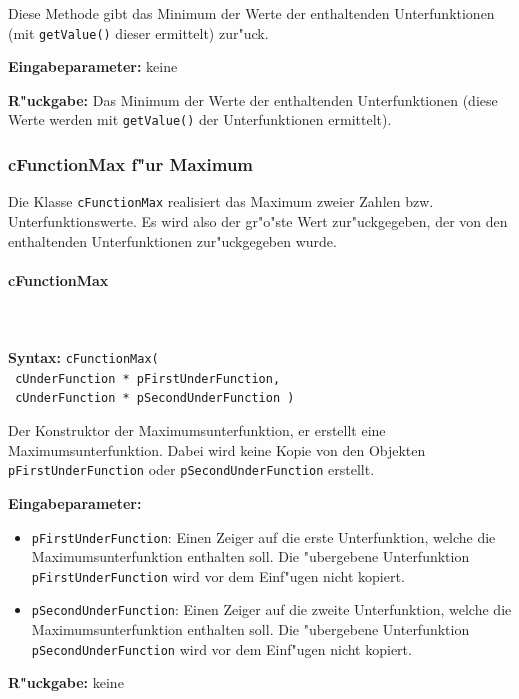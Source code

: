 \bigskip\noindent
Diese Methode gibt das Minimum der Werte der enthaltenden Unterfunktionen (mit \verb|getValue()| dieser ermittelt) zur"uck.

\bigskip\noindent
\textbf{Eingabeparameter:} keine

\bigskip\noindent
\textbf{R"uckgabe:} Das Minimum der Werte der enthaltenden Unterfunktionen (diese Werte werden mit \verb|getValue()| der Unterfunktionen ermittelt).


\subsubsection{cFunctionMax f"ur Maximum}

Die Klasse \verb|cFunctionMax| realisiert das Maximum zweier Zahlen bzw. Unterfunktionswerte. Es wird also der gr"o"ste Wert zur"uckgegeben, der von den enthaltenden Unterfunktionen zur"uckgegeben wurde.

\paragraph{cFunctionMax}

\ \\\\\noindent
\textbf{Syntax:} \verb|cFunctionMax(| \\\verb| cUnderFunction * pFirstUnderFunction,| \\\verb| cUnderFunction * pSecondUnderFunction )|

\bigskip\noindent
Der Konstruktor der Maximumsunterfunktion, er erstellt eine Maximumsunterfunktion. Dabei wird keine Kopie von den Objekten \verb|pFirstUnderFunction| oder \verb|pSecondUnderFunction| erstellt.

\bigskip\noindent
\textbf{Eingabeparameter:}
\begin{itemize}
 \item \verb|pFirstUnderFunction|: Einen Zeiger auf die erste Unterfunktion, welche die Maximumsunterfunktion enthalten soll. Die "ubergebene Unterfunktion \verb|pFirstUnderFunction| wird vor dem Einf"ugen nicht kopiert.
 \item \verb|pSecondUnderFunction|: Einen Zeiger auf die zweite Unterfunktion, welche die Maximumsunterfunktion enthalten soll. Die "ubergebene Unterfunktion \verb|pSecondUnderFunction| wird vor dem Einf"ugen nicht kopiert.
\end{itemize}

\bigskip\noindent
\textbf{R"uckgabe:} keine



